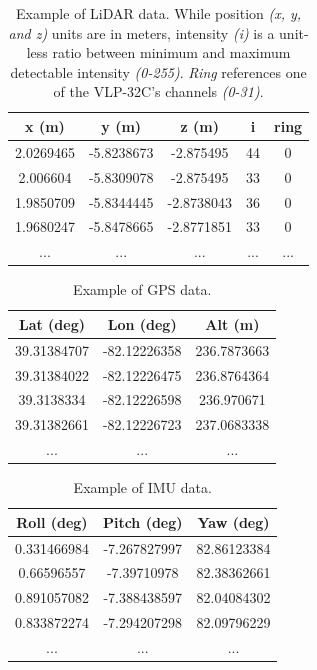 \documentclass[numbered,pdftex]{ohio-etd}
\begin{document}
{{		\begin{table}[H]
			\centering
			\begin{tabular}{|c|c|c|c|c|}
				\hline
				x (m)     & y (m)      & z (m)      & i   & ring \\
				\hline
				2.0269465 & -5.8238673 & -2.875495  & 44  & 0    \\
				\hline
				2.006604  & -5.8309078 & -2.875495  & 33  & 0    \\
				\hline
				1.9850709 & -5.8344445 & -2.8738043 & 36  & 0    \\
				\hline
				1.9680247 & -5.8478665 & -2.8771851 & 33  & 0    \\
				\hline
				...       & ...        & ...        & ... & ...  \\
				\hline
			\end{tabular}
			\caption[Example LiDAR Data]{Example of LiDAR data. While position \textit{(x, y, and z)} units are in meters, intensity \textit{(i)} is a unit-less ratio between minimum and maximum detectable intensity \textit{(0-255)}. \textit{Ring} references one of the VLP-32C's channels \textit{(0-31)}.}
			\label{tab:example_lidar_data}
		\end{table}
		
		\begin{table}[H]
			\centering
			\begin{tabular}{|c|c|c|}
				\hline
				Lat (deg)   & Lon (deg)    & Alt (m)     \\
				\hline
				39.31384707 & -82.12226358 & 236.7873663 \\
				\hline
				39.31384022 & -82.12226475 & 236.8764364 \\
				\hline
				39.3138334  & -82.12226598 & 236.970671  \\
				\hline
				39.31382661 & -82.12226723 & 237.0683338 \\
				\hline
				...         & ...          & ...       \\ 
				\hline
			\end{tabular}
			\caption[Example GPS Data]{Example of GPS data. }
			\label{tab:example_gps_data}
		\end{table}	
	
		
		\begin{table}[H]
		\centering
		\begin{tabular}{|c|c|c|}
			\hline
			Roll (deg)  & Pitch (deg)  & Yaw (deg)   \\
			\hline
			0.331466984 & -7.267827997 & 82.86123384 \\
			\hline
			0.66596557  & -7.39710978  & 82.38362661 \\
			\hline
			0.891057082 & -7.388438597 & 82.04084302 \\
			\hline
			0.833872274 & -7.294207298 & 82.09796229 \\
			\hline
			...         & ...          & ...        \\
			\hline
		\end{tabular}
		\caption[Example IMU Data]{Example of IMU data.}
		\label{tab:example_imu_data}
		\end{table}
		
}}
\end{document}
